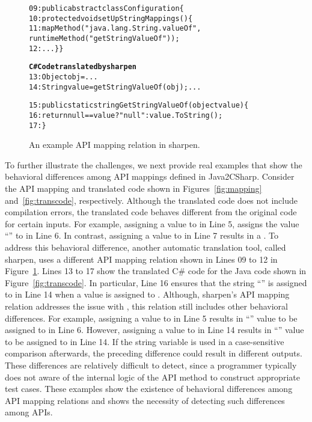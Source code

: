 
\begin{figure}
\begin{CodeOut}
\begin{alltt}
09: public abstract class Configuration \{
10: protected void setUpStringMappings() \{
11:   mapMethod("java.lang.String.valueOf",
              runtimeMethod("getStringValueOf"));
12: ...\} \}

\textbf{C# Code translated by sharpen}
13: Object obj = ...
14: String value = getStringValueOf(obj); ...

15: public static string GetStringValueOf(object value)\{
16:   return null == value? "null": value.ToString();
17: \}
\end{alltt}
\end{CodeOut}\vspace*{-4ex}
\caption{\label{fig:sharpen} An example API mapping relation in sharpen.}\vspace*{-4ex}
\end{figure}

To further illustrate the challenges, we next provide real examples that show the behavioral differences among API mappings defined in Java2CSharp. Consider the API mapping and translated code shown in Figures~\ref{fig:mapping} and~\ref{fig:transcode}, respectively. Although the translated code does not include compilation errors, the translated code behaves different from the original code for certain inputs. For example, assigning a  value to  in Line 5, assigns the value ``'' to   in Line 6. In contrast, assigning a  value to  in Line 7 results in a . To address this behavioral difference, another automatic translation tool, called sharpen, uses a different API mapping relation shown in Lines 09 to 12 in Figure~\ref{fig:sharpen}. Lines 13 to 17 show the translated C\# code for the Java code shown in Figure~\ref{fig:transcode}. In particular, Line 16 ensures that the string ``'' is assigned to  in Line 14 when a  value is assigned to . Although, sharpen's API mapping relation addresses the issue with , this relation still includes other behavioral differences. For example, assigning a  value to  in Line 5 results in ``'' value to be assigned to  in Line 6. However, assigning a  value to  in Line 14 results in ``'' value to be assigned to  in Line 14. If the string variable  is used in a case-sensitive comparison afterwards, the preceding difference could result in different outputs. These differences are relatively difficult to detect, since a programmer typically does not aware of the internal logic of the API method to construct appropriate test cases. These examples show the existence of behavioral differences among API mapping relations and shows the necessity of detecting such differences among APIs.

